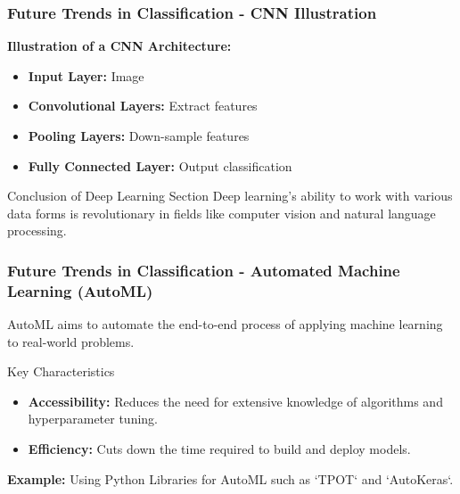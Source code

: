 \documentclass[aspectratio=169]{beamer}
\begin{document}
\begin{frame}[fragile]
    \frametitle{Future Trends in Classification - CNN Illustration}
    \textbf{Illustration of a CNN Architecture:}
    
    \begin{itemize}
        \item \textbf{Input Layer:} Image
        \item \textbf{Convolutional Layers:} Extract features
        \item \textbf{Pooling Layers:} Down-sample features
        \item \textbf{Fully Connected Layer:} Output classification
    \end{itemize}
    
    \begin{block}{Conclusion of Deep Learning Section}
        Deep learning's ability to work with various data forms is revolutionary in fields like computer vision and natural language processing.
    \end{block}
\end{frame}

\begin{frame}[fragile]
    \frametitle{Future Trends in Classification - Automated Machine Learning (AutoML)}
    AutoML aims to automate the end-to-end process of applying machine learning to real-world problems.

    \begin{block}{Key Characteristics}
        \begin{itemize}
            \item \textbf{Accessibility:} Reduces the need for extensive knowledge of algorithms and hyperparameter tuning.
            \item \textbf{Efficiency:} Cuts down the time required to build and deploy models.
        \end{itemize}
    \end{block}

    \textbf{Example:} Using Python Libraries for AutoML such as `TPOT` and `AutoKeras`.
\end{frame}
\end{document}
